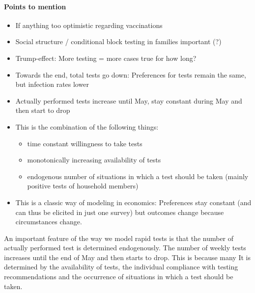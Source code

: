 \paragraph{Points to mention}
\begin{itemize}
    \item If anything too optimistic regarding vaccinations
    \item Social structure / conditional block testing in families important (?)
    \item Trump-effect: More testing = more cases true for how long?
    \item Towards the end, total tests go down: Preferences for tests remain the same,
          but infection rates lower 
    \item Actually performed tests increase until May, stay constant during May and then start to drop
    \item This is the combination of the following things:
    \begin{itemize}
        \item time constant willingness to take tests
        \item monotonically increasing availability of tests
        \item endogenous number of situations in which a test should be taken (mainly positive tests of household members)
    \end{itemize}
    \item This is a classic way of modeling in economics: Preferences stay constant
          (and can thus be elicited in just one survey) but outcomes change because
          circumstances change.

\end{itemize}


An important feature of the way we model rapid tests is that the number of actually
performed test is determined endogenously. The number of weekly tests increases until
the end of May and then starts to drop. This is because many  It is determined by the availability of tests,
the individual compliance with testing recommendations and the occurrence of situations
in which a test should be taken.






